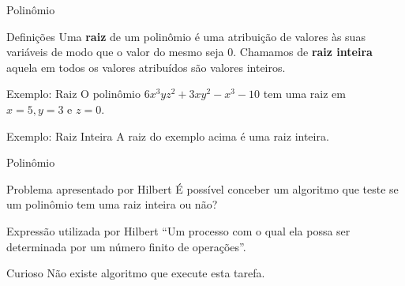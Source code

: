 \documentclass[xcolor=dvipsnames,table]{beamer}
\begin{document}
	\begin{frame}{Polinômio}
		\begin{block}{Definições}	
			Uma {\bf raiz} de um polinômio é uma atribuição de valores às suas variáveis de modo que o valor do mesmo seja 0. Chamamos de {\bf raiz inteira} aquela em todos os valores atribuídos são valores inteiros.
		\end{block} 
		\begin{block}{Exemplo: Raiz}
			O polinômio $6x^3 y z^2 + 3x y^2 -x^3 - 10$ tem uma raiz em $x=5, y=3$ e $z=0$.
		\end{block} 
		\begin{block}{Exemplo: Raiz Inteira}
			A raiz do exemplo acima é uma raiz inteira.
		\end{block}
	\end{frame}
	
	\begin{frame}{Polinômio}
		\begin{block}{Problema apresentado por Hilbert}
			É possível conceber um algoritmo que teste se um polinômio tem uma raiz inteira ou não?
		\end{block}  
		\begin{block}{Expressão utilizada por Hilbert}
			``Um processo com o qual ela possa ser determinada por um número finito de operações''.
		\end{block}  
		\begin{alertblock}{Curioso}
			Não existe algoritmo que execute esta tarefa.
		\end{alertblock}
	\end{frame}
	
\end{document}
